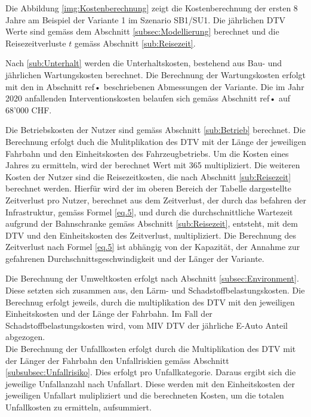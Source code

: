 %
%
%
%


Die Abbildung \ref{img:Kostenberechnung} zeigt die Kostenberechnung der ersten 8 Jahre am Beispiel der Variante 1 im Szenario SB1/SU1. 
Die jährlichen DTV Werte sind gemäss dem Abschnitt \ref{subsec:Modellierung} berechnet und die Reisezeitverluste $t$ gemäss Abschnitt \ref{sub:Reisezeit}. 

Nach \ref{sub:Unterhalt} werden die Unterhaltskosten, bestehend aus Bau- und jährlichen Wartungskosten berechnet. Die Berechnung der Wartungskosten erfolgt mit den in Abschnitt ref{•} beschriebenen Abmessungen der Variante. Die im Jahr 2020 anfallenden Interventionskosten belaufen sich gemäss Abschnitt ref{•} auf 68'000 CHF.

Die Betriebskosten der Nutzer sind gemäss Abschnitt \ref{sub:Betrieb} berechnet. Die Berechnung erfolgt duch die Mulitplikation des DTV mit der Länge der jeweiligen Fahrbahn und den Einheitskosten des Fahrzeugbetriebs. Um die Kosten eines Jahres zu ermitteln, wird der berechnet Wert mit 365 multipliziert. Die weiteren Kosten der Nutzer sind die Reisezeitkosten, die nach Abschnitt \ref{sub:Reisezeit} berechnet werden. Hierfür wird der im oberen Bereich der Tabelle dargestellte Zeitverlust pro Nutzer, berechnet aus dem Zeitverlust, der durch das befahren der Infrastruktur, gemäss Formel \ref{eq.5}, und durch die durchschnittliche Wartezeit aufgrund der Bahnschranke gemäss Abschnitt \ref{sub:Reisezeit}, entsteht, mit dem DTV und den Einheitskosten des Zeitverlust, multipliziert. Die Berechnung des Zeitverlust nach Formel \ref{eq.5} ist abhängig von der Kapazität, der Annahme zur gefahrenen Durchschnittsgeschwindigkeit und der Länger der Variante.

Die Berechnung der Umweltkosten erfolgt nach Abschnitt \ref{subsec:Environment}. Diese setzten sich zusammen aus, den Lärm- und Schadstoffbelastungskosten. Die Berechnug erfolgt jeweils, durch die multiplikation des DTV mit den jeweiligen Einheitskosten und der Länge der Fahrbahn. Im Fall der Schadstoffbelastungskosten wird, vom MIV DTV der jährliche E-Auto Anteil abgezogen. \\
Die Berechnung der Unfallkosten erfolgt durch die Multiplikation des DTV mit der Länger der Fahrbahn den Unfallriskien gemäss Abschnitt \ref{subsubsec:Unfallrisiko}. Dies erfolgt pro Unfallkategorie. Daraus ergibt sich die jeweilige Unfallanzahl nach Unfallart. Diese werden mit den Einheitskosten der jeweiligen Unfallart mulipliziert und die berechneten Kosten, um die totalen Unfallkosten zu ermitteln, aufsummiert.
 
